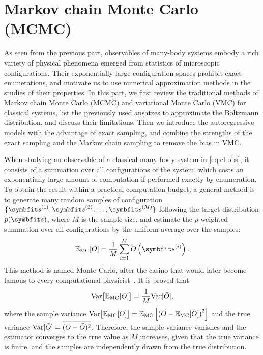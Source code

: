 \chapter{Markov chain Monte Carlo (MCMC)}

As seen from the previous part, observables of many-body systems embody a rich variety of physical phenomena emerged from statistics of microscopic configurations. Their exponentially large configuration spaces prohibit exact enumerations, and motivate us to use numerical approximation methods in the studies of their properties. In this part, we first review the traditional methods of Markov chain Monte Carlo (MCMC) and variational Monte Carlo (VMC) for classical systems, list the previously used ansatzes to approximate the Boltzmann distribution, and discuss their limitations. Then we introduce the autoregressive models with the advantage of exact sampling, and combine the strengths of the exact sampling and the Markov chain sampling to remove the bias in VMC.

When studying an observable of a classical many-body system in \cref{eq:cl-obs}, it consists of a summation over all configurations of the system, which costs an exponentially large amount of computation if performed exactly by enumeration. To obtain the result within a practical computation budget, a general method is to generate many random samples of configuration $\{\vs^{(1)}, \vs^{(2)}, \ldots, \vs^{(M)}\}$ following the target distribution $p(\vs)$, where $M$ is the sample size, and estimate the $p$-weighted summation over all configurations by the uniform average over the samples:
\begin{equation}
\bbE_\text{MC}[O] = \frac{1}{M} \sum_{i = 1}^M O\left( \vs^{(i)} \right).
\label{eq:monte-carlo}
\end{equation}
This method is named Monte Carlo, after the casino that would later become famous to every computational physicist~\cite{metropolis1949monte, landau2021guide1}. It is proved that~\cite{feller1968extention}
\begin{equation}
\mathrm{Var}\big[ \mathbb{E}_\text{MC}[O] \big] = \frac{1}{M} \mathrm{Var}[\bar{O}],
\label{eq:monte-carlo-var}
\end{equation}
where the sample variance $\mathrm{Var}\big[ \mathbb{E}_\text{MC}[O] \big] = \mathbb{E}_\text{MC}\left[ \left( O - \mathbb{E}_\text{MC}[O] \right)^2 \right]$ and the true variance $\mathrm{Var}[\bar{O}] = \overline{(O - \bar{O})^2}$. Therefore, the sample variance vanishes and the estimator converges to the true value as $M$ increases, given that the true variance is finite, and the samples are independently drawn from the true distribution.

